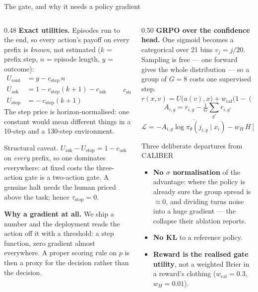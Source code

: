 \documentclass[10pt, aspectratio=169]{beamer}
\newcommand{\bad}[1]{\textcolor{warn}{#1}}
\begin{document}
\begin{frame}{The gate, and why it needs a policy gradient}
\footnotesize
\begin{columns}[t]
\begin{column}{0.48\textwidth}
\textbf{Exact utilities.} Episodes run to the end, so every action's payoff on
every prefix is \emph{known}, not estimated ($k$ = prefix step, $n$ = episode
length, $y$ = outcome):
\[
\begin{aligned}
U_{\text{cont}} &= y - c_{\text{step}}\,n\\
U_{\text{ask}}  &= 1 - c_{\text{step}}(k{+}1) - c_{\text{ask}}\\
U_{\text{stop}} &= -\,c_{\text{step}}(k{+}1)
\end{aligned}
\qquad
c_{\text{step}}=\frac{\kappa}{\mathrm{median}(n)}
\]
The step price is horizon-normalised: one constant would mean different things
in a 10-step and a 130-step environment.

\medskip
\bad{Structural caveat.} $U_{\text{ask}}-U_{\text{stop}}=1-c_{\text{ask}}$ on
\emph{every} prefix, so one dominates everywhere: at fixed costs the
three-action gate is a two-action gate. A genuine halt needs the human priced
above the task; hence $\tau_{\text{stop}}=0$.

\medskip
\textbf{Why a gradient at all.} We ship a number and the deployment reads the
action off it with a threshold: a step function, zero gradient almost
everywhere. A proper scoring rule on $p$ is then a proxy for the decision
rather than the decision.
\end{column}
\begin{column}{0.50\textwidth}
\textbf{GRPO over the confidence head.} One sigmoid becomes a categorical over
21 bins $v_j=j/20$. Sampling is free --- one forward gives the whole
distribution --- so a group of $G{=}8$ costs one supervised step.
\setlength{\abovedisplayskip}{3pt}\setlength{\belowdisplayskip}{3pt}
\[
r(x,v)=U\big(a(v),x\big)+w_{\text{cal}}\big(1-(v-y)^2\big)
\]
\[
A_{i,g}=r_{i,g}-\tfrac{1}{G}\textstyle\sum_{g'}r_{i,g'}
\]
\[
\mathcal{L}=-\overline{A_{i,g}\log\pi_\theta(j_{i,g}\mid x_i)}
            -w_H\,\overline{H[\pi_\theta(\cdot\mid x_i)]}
\]
\vspace{-5pt}\begin{block}{Three deliberate departures from CALIBER}
\begin{itemize}\itemsep1pt
  \item \textbf{No $\sigma$ normalisation} of the advantage: where the policy is
        already sure the group spread is $\approx0$, and dividing turns noise
        into a huge gradient --- the collapse their ablation reports.
  \item \textbf{No KL} to a reference policy.
  \item \textbf{Reward is the realised gate utility}, not a weighted Brier in a
        reward's clothing ($w_{\text{cal}}{=}0.3$, $w_H{=}0.01$).
\end{itemize}
\end{block}
\end{column}
\end{columns}
\end{frame}
\end{document}
